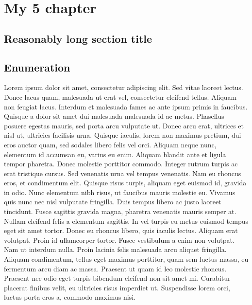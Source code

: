 
\chapter{My 5 chapter}

\ifpdf
    \graphicspath{{Chapter5/Figs/Raster/}{Chapter5/Figs/PDF/}{Chapter5/Figs/}}
\else
    \graphicspath{{Chapter5/Figs/Vector/}{Chapter5/Figs/}}
\fi


\section[Short title]{Reasonably long section title}



\section*{Enumeration}
Lorem ipsum dolor sit amet, consectetur adipiscing elit. Sed vitae laoreet lectus.
Donec lacus quam, malesuada ut erat vel, consectetur eleifend tellus. Aliquam non
feugiat lacus. Interdum et malesuada fames ac ante ipsum primis in faucibus.
Quisque a dolor sit amet dui malesuada malesuada id ac metus. Phasellus posuere
egestas mauris, sed porta arcu vulputate ut. Donec arcu erat, ultrices et nisl ut,
ultricies facilisis urna. Quisque iaculis, lorem non maximus pretium, dui eros
auctor quam, sed sodales libero felis vel orci. Aliquam neque nunc, elementum id
accumsan eu, varius eu enim. Aliquam blandit ante et ligula tempor pharetra.
Donec molestie porttitor commodo. Integer rutrum turpis ac erat tristique cursus.
Sed venenatis urna vel tempus venenatis. Nam eu rhoncus eros, et condimentum elit.
Quisque risus turpis, aliquam eget euismod id, gravida in odio. Nunc elementum
nibh risus, ut faucibus mauris molestie eu.
Vivamus quis nunc nec nisl vulputate fringilla. Duis tempus libero ac justo
laoreet tincidunt. Fusce sagittis gravida magna, pharetra venenatis mauris
semper at. Nullam eleifend felis a elementum sagittis. In vel turpis eu metus
euismod tempus eget sit amet tortor. Donec eu rhoncus libero, quis iaculis lectus.
Aliquam erat volutpat. Proin id ullamcorper tortor. Fusce vestibulum a enim non
volutpat. Nam ut interdum nulla. Proin lacinia felis malesuada arcu aliquet fringilla.
Aliquam condimentum, tellus eget maximus porttitor, quam sem luctus massa,
eu fermentum arcu diam ac massa. Praesent ut quam id leo molestie rhoncus.
Praesent nec odio eget turpis bibendum eleifend non sit amet mi. Curabitur placerat
finibus velit, eu ultricies risus imperdiet ut. Suspendisse lorem orci, luctus
porta eros a, commodo maximus nisi.


